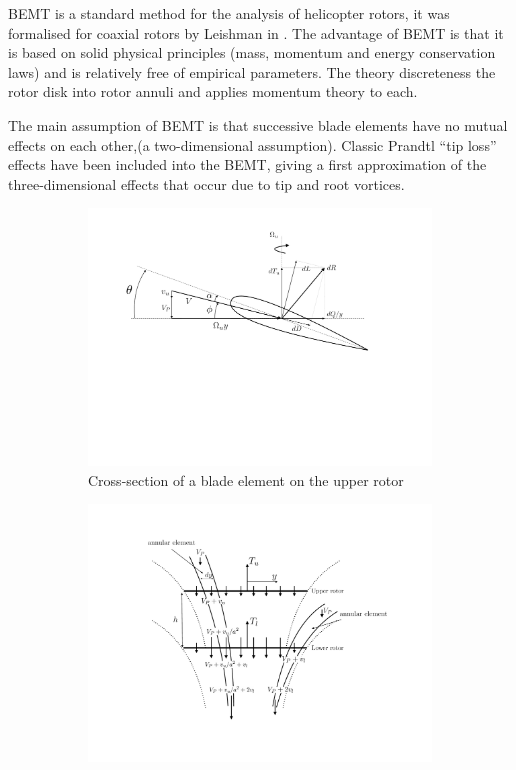 BEMT is a standard method for the analysis of helicopter rotors, it was formalised for coaxial rotors by Leishman in \cite{BEMT}. The advantage of BEMT is that it is based on solid physical principles (mass, momentum and energy conservation laws) and is relatively free of empirical parameters. The theory discreteness the rotor disk into rotor annuli and applies momentum theory to each.

The main assumption of BEMT is that successive blade elements have no mutual effects on each other,(a two-dimensional assumption). Classic Prandtl “tip loss” effects have been included into the BEMT, giving a first approximation of the three-dimensional effects that occur due to tip and root vortices.


\begin{figure}[]
\captionsetup[subfigure]{justification=centering}
\begin{subfigure}[t]{0.5\textwidth}
    \centering
    \includegraphics[width=\textwidth]{Figures/blade_axial.pdf}
    \caption{Cross-section of a blade element on the upper rotor}
    \label{fig:blade2d}
\end{subfigure}
\begin{subfigure}[t]{0.5\textwidth}
    \centering
    \includegraphics[width=\textwidth]{Figures/disk2D_BEM_axial.pdf}

\end{subfigure}
\end{figure}
